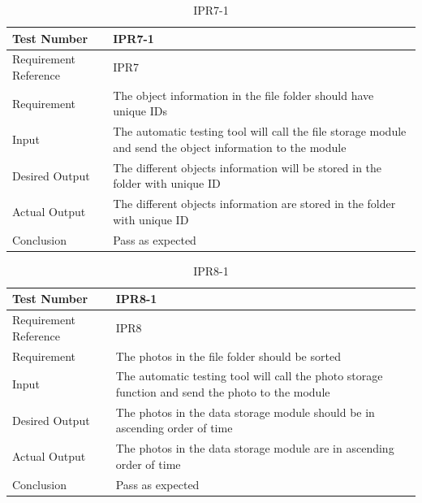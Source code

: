\documentclass[12pt, titlepage]{article}
\begin{document}
\begin{table}[H]
\begin{center}
\begin{tabular}{|l | m{9cm}|}
\hline
  Test Number & IPR7-1\\
  \hline
  Requirement Reference & IPR7\\
  \hline
  Requirement & The object information in the file folder should have unique IDs\\
  \hline
  Input & The automatic testing tool will call the file storage module and send the object information to the module\\
  \hline
  Desired Output & The different objects information will be stored in the folder with unique ID\\
  \hline
  Actual Output & The different objects information are stored in the folder with unique ID\\
  \hline
  Conclusion & Pass as expected\\
  \hline
\end{tabular}
\end{center}       
\caption{IPR7-1}
\end{table}

\begin{table}[H]
\begin{center}
\begin{tabular}{|l | m{9cm}|}
\hline
  Test Number & IPR8-1\\
  \hline
  Requirement Reference & IPR8\\
  \hline
  Requirement & The photos in the file folder should be sorted\\
  \hline
  Input & The automatic testing tool will call the photo storage function and send the photo to the module\\
  \hline
  Desired Output & The photos in the data storage module should be in ascending order of time\\
  \hline
  Actual Output & The photos in the data storage module are in ascending order of time\\
  \hline
  Conclusion & Pass as expected\\
  \hline
\end{tabular}
\end{center}       
\caption{IPR8-1}
\end{table}
\end{document}

